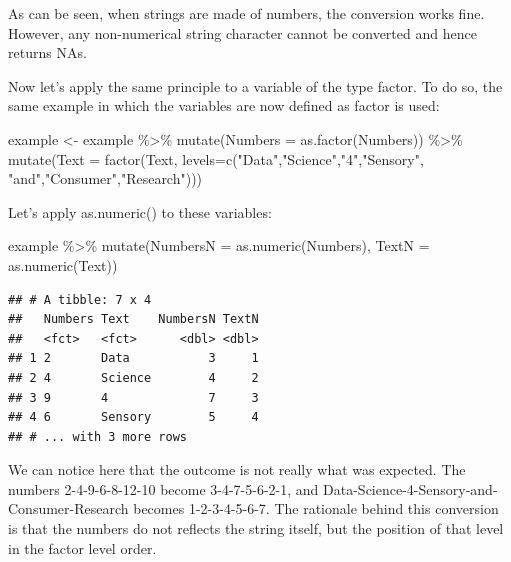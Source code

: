 \documentclass[
]{krantz}
\makeatletter
\newenvironment{Shaded}{\begin{snugshade}}{\end{snugshade}}
\newcommand{\AttributeTok}[1]{\textcolor[rgb]{0.61,0.61,0.61}{#1}}
\newcommand{\FunctionTok}[1]{\textcolor[rgb]{0,0,0}{#1}}
\newcommand{\NormalTok}[1]{#1}
\newcommand{\OtherTok}[1]{\textcolor[rgb]{0.37,0.37,0.37}{#1}}
\newcommand{\SpecialCharTok}[1]{\textcolor[rgb]{0,0,0}{#1}}
\newcommand{\StringTok}[1]{\textcolor[rgb]{0.5,0.5,0.5}{#1}}
\newenvironment{kframe}{%
\medskip{}
\setlength{\fboxsep}{.8em}
 \def\at@end@of@kframe{}%
 \ifinner\ifhmode%
  \def\at@end@of@kframe{\end{minipage}}%
  \begin{minipage}{\columnwidth}%
 \fi\fi%
 \def\FrameCommand##1{\hskip\@totalleftmargin \hskip-\fboxsep
 \colorbox{shadecolor}{##1}\hskip-\fboxsep
     \hskip-\linewidth \hskip-\@totalleftmargin \hskip\columnwidth}%
 \MakeFramed {\advance\hsize-\width
   \@totalleftmargin\z@ \linewidth\hsize
   \@setminipage}}%
 {\par\unskip\endMakeFramed%
 \at@end@of@kframe}
\renewenvironment{Shaded}{\begin{kframe}}{\end{kframe}}
\makeatother
\begin{document}
As can be seen, when strings are made of numbers, the conversion works fine. However, any non-numerical string character cannot be converted and hence returns NAs.

Now let's apply the same principle to a variable of the type factor. To do so, the same example in which the variables are now defined as factor is used:

\begin{Shaded}
\begin{Highlighting}[]
\NormalTok{example }\OtherTok{\textless{}{-}}\NormalTok{ example }\SpecialCharTok{\%\textgreater{}\%} 
  \FunctionTok{mutate}\NormalTok{(}\AttributeTok{Numbers =} \FunctionTok{as.factor}\NormalTok{(Numbers)) }\SpecialCharTok{\%\textgreater{}\%} 
  \FunctionTok{mutate}\NormalTok{(}\AttributeTok{Text =} \FunctionTok{factor}\NormalTok{(Text, }\AttributeTok{levels=}\FunctionTok{c}\NormalTok{(}\StringTok{"Data"}\NormalTok{,}\StringTok{"Science"}\NormalTok{,}\StringTok{"4"}\NormalTok{,}\StringTok{"Sensory"}\NormalTok{,}
                                      \StringTok{"and"}\NormalTok{,}\StringTok{"Consumer"}\NormalTok{,}\StringTok{"Research"}\NormalTok{)))}
\end{Highlighting}
\end{Shaded}

Let's apply as.numeric() to these variables:

\begin{Shaded}
\begin{Highlighting}[]
\NormalTok{example }\SpecialCharTok{\%\textgreater{}\%} 
  \FunctionTok{mutate}\NormalTok{(}\AttributeTok{NumbersN =} \FunctionTok{as.numeric}\NormalTok{(Numbers), }\AttributeTok{TextN =} \FunctionTok{as.numeric}\NormalTok{(Text))}
\end{Highlighting}
\end{Shaded}

\begin{verbatim}
## # A tibble: 7 x 4
##   Numbers Text    NumbersN TextN
##   <fct>   <fct>      <dbl> <dbl>
## 1 2       Data           3     1
## 2 4       Science        4     2
## 3 9       4              7     3
## 4 6       Sensory        5     4
## # ... with 3 more rows
\end{verbatim}

We can notice here that the outcome is not really what was expected. The numbers 2-4-9-6-8-12-10 become 3-4-7-5-6-2-1, and Data-Science-4-Sensory-and-Consumer-Research becomes 1-2-3-4-5-6-7. The rationale behind this conversion is that the numbers do not reflects the string itself, but the position of that level in the factor level order.
\end{document}
